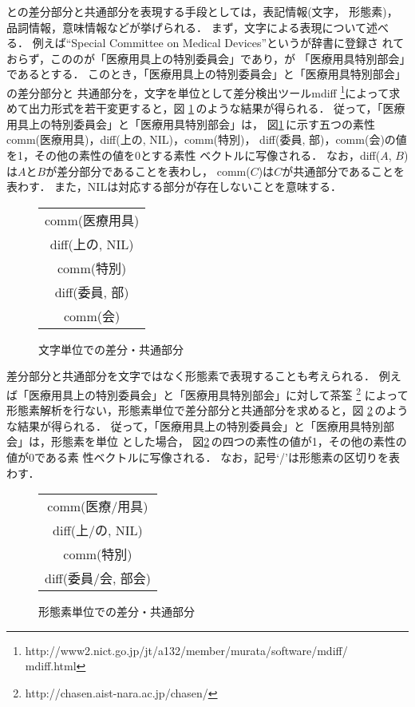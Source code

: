 {\CT}と{\NT}の差分部分と共通部分を表現する手段としては，表記情報(文字，
形態素)，品詞情報，意味情報などが挙げられる．
まず，文字による表現について述べる．
例えば``Special Committee on Medical Devices''という{\ENP}が辞書に登録さ
れておらず，この{\ENP}の{\CT}が「医療用具上の特別委員会」であり，{\NT}が
「医療用具特別部会」であるとする．
このとき，「医療用具上の特別委員会」と「医療用具特別部会」の差分部分と
共通部分を，文字を単位として差分検出ツールmdiff 
\footnote{http://www2.nict.go.jp/jt/a132/member/murata/software/mdiff/
mdiff.html}によって求めて出力形式を若干変更すると，図
\ref{fig:mdiff_char}\,のような結果が得られる．
従って，「医療用具上の特別委員会」と「医療用具特別部会」は，
図\ref{fig:mdiff_char}\,に示す五つの素性
comm(医療用具)，diff(上の, NIL)，comm(特別)，
diff(委員, 部)，comm(会)の値を1，その他の素性の値を0とする素性
ベクトルに写像される．
なお，diff($A$, $B$)は$A$と$B$が差分部分であることを表わし，
comm($C$)は$C$が共通部分であることを表わす．
また，NILは対応する部分が存在しないことを意味する．
\begin{figure}[htbp]
\begin{center}
\begin{tabular}{|c|}\hline
comm(医療用具) \\
diff(上の, NIL) \\
comm(特別) \\
diff(委員, 部) \\
comm(会) \\\hline
\end{tabular}
\end{center}
\caption{文字単位での差分・共通部分}
\label{fig:mdiff_char}
\end{figure}

差分部分と共通部分を文字ではなく形態素で表現することも考えられる．
例えば「医療用具上の特別委員会」と「医療用具特別部会」に対して茶筌
\footnote{http://chasen.aist-nara.ac.jp/chasen/}
によって形態素解析を行ない，形態素単位で差分部分と共通部分を求めると，図
\ref{fig:mdiff_morph}\,のような結果が得られる．
従って，「医療用具上の特別委員会」と「医療用具特別部会」は，形態素を単位
とした場合，
図\ref{fig:mdiff_morph}\,の四つの素性の値が1，その他の素性の値が0である素
性ベクトルに写像される．
なお，記号`/'は形態素の区切りを表わす．
\begin{figure}[htbp]
\begin{center}
\begin{tabular}{|c|}\hline
comm(医療/用具) \\
diff(上/の, NIL) \\
comm(特別) \\
diff(委員/会, 部会) \\\hline
\end{tabular}
\end{center}
\caption{形態素単位での差分・共通部分}
\label{fig:mdiff_morph}
\end{figure}

